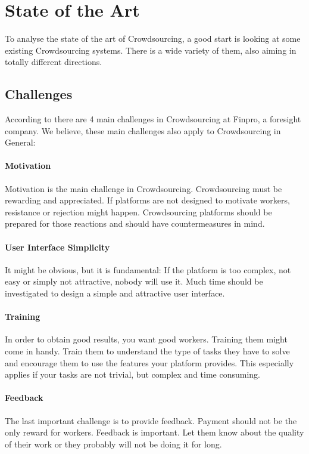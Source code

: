 \documentclass{sig-alternate}
\begin{document}
\section{State of the Art}

To analyse the state of the art of Crowdsourcing, a good start is looking at some existing Crowdsourcing systems.
There is a wide variety of them, also aiming in totally different directions.

\subsection{Challenges}

According to \cite{r02} there are 4 main challenges in Crowdsourcing at Finpro, a foresight company. We believe, these
main challenges also apply to Crowdsourcing in General:

\paragraph{Motivation}
Motivation is the main challenge in Crowdsourcing. Crowdsourcing must be rewarding and appreciated. If platforms
are not designed to motivate workers, resistance or rejection might happen. Crowdsourcing platforms should be prepared
for those reactions and should have countermeasures in mind.

\paragraph{User Interface Simplicity}
It might be obvious, but it is fundamental: If the platform is too complex, not easy or simply not attractive, nobody will use it.
Much time should be investigated to design a simple and attractive user interface.

\paragraph{Training}
In order to obtain good results, you want good workers. Training them might come in handy. Train them to understand the type of 
tasks they have to solve and encourage them to use the features your platform provides. This especially applies if your tasks are not
trivial, but complex and time consuming.

\paragraph{Feedback}
The last important challenge is to provide feedback. Payment should not be the only reward for workers. Feedback is important.
Let them know about the quality of their work or they probably will not be doing it for long.
\end{document}
